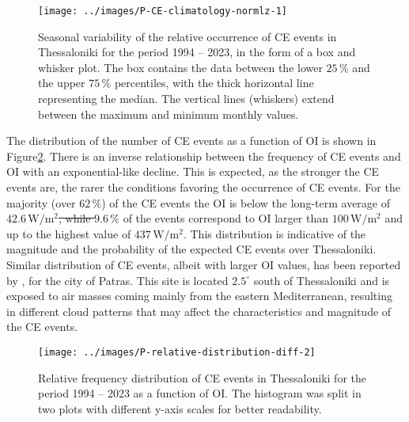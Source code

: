 \documentclass[preprint, 5p,
authoryear]{elsarticle} %
\providecommand{\DIFaddtex}[1]{{\protect\color{blue}\uwave{#1}}} %
\providecommand{\DIFdeltex}[1]{{\protect\color{red}\sout{#1}}}                      %
\providecommand{\DIFaddbegin}{} %
\providecommand{\DIFaddend}{} %
\providecommand{\DIFdelbegin}{} %
\providecommand{\DIFdelend}{} %
\providecommand{\DIFadd}[1]{\texorpdfstring{\DIFaddtex{#1}}{#1}} %
\providecommand{\DIFdel}[1]{\texorpdfstring{\DIFdeltex{#1}}{}} %
\newcommand{\DIFscaledelfig}{0.5}
\newlength{\DIFdelgraphicswidth} %
\newlength{\DIFdelgraphicsheight} %
\newcommand{\DIFaddincludegraphics}[2][]{{\color{blue}\fbox{\DIFOincludegraphics[#1]{#2}}}} %
\newcommand{\DIFdelincludegraphics}[2][]{%
\sbox{\DIFdelgraphicsbox}{\DIFOincludegraphics[#1]{#2}}%
\settoboxwidth{\DIFdelgraphicswidth}{\DIFdelgraphicsbox} %
\settoboxtotalheight{\DIFdelgraphicsheight}{\DIFdelgraphicsbox} %
\scalebox{\DIFscaledelfig}{%
\parbox[b]{\DIFdelgraphicswidth}{\usebox{\DIFdelgraphicsbox}\\[-\baselineskip] \rule{\DIFdelgraphicswidth}{0em}}\llap{\resizebox{\DIFdelgraphicswidth}{\DIFdelgraphicsheight}{%
\setlength{\unitlength}{\DIFdelgraphicswidth}%
\begin{picture}(1,1)%
\thicklines\linethickness{2pt} %
{\color[rgb]{1,0,0}\put(0,0){\framebox(1,1){}}}%
{\color[rgb]{1,0,0}\put(0,0){\line( 1,1){1}}}%
{\color[rgb]{1,0,0}\put(0,1){\line(1,-1){1}}}%
\end{picture}%
}\hspace*{3pt}}} %
} %
\DeclareRobustCommand{\DIFaddbegin}{\DIFOaddbegin \let\includegraphics\DIFaddincludegraphics} %
\DeclareRobustCommand{\DIFaddend}{\DIFOaddend \let\includegraphics\DIFOincludegraphics} %
\DeclareRobustCommand{\DIFdelbegin}{\DIFOdelbegin \let\includegraphics\DIFdelincludegraphics} %
\DeclareRobustCommand{\DIFdelend}{\DIFOaddend \let\includegraphics\DIFOincludegraphics} %
\begin{document}
\begin{figure}

{\centering \texttt{[image: ../images/P-CE-climatology-normlz-1]} 

}

\caption{Seasonal variability of the relative occurrence of CE events in Thessaloniki for the period 1994 -- 2023, in the form of a box and whisker plot. The box contains the data between the lower $25\,\%$ and the upper $75\,\%$ percentiles, with the thick horizontal line representing the median. The vertical lines (whiskers) extend between the maximum and minimum monthly values.}\label{fig:relative-month-occurrences}
\end{figure}

The distribution of the number of CE events as a function of OI is shown
in Figure\nobreakspace{}\ref{fig:ovir-distribution}. There is an inverse
relationship between the frequency of CE events and OI with an
exponential-like decline. This is expected, as the stronger the CE
events are, the rarer the conditions favoring the occurrence of CE
events. For the majority (over \(62\,\%\)) of the CE events the OI is
below the long-term average of \DIFdelbegin \DIFdel{\(42.6\,\text{W}/\text{m}^2\), while
\(9.6\,\%\) }\DIFdelend \DIFaddbegin \DIFadd{\(42.7\,\text{W}/\text{m}^2\), while
\(9.7\,\%\) }\DIFaddend of the events correspond to OI larger than
\(100\,\text{W}/\text{m}^2\) and up to the highest value of
\DIFdelbegin \DIFdel{\(437\,\text{W}/\text{m}^2\)}\DIFdelend \DIFaddbegin \DIFadd{\(438.2\,\text{W}/\text{m}^2\)}\DIFaddend . This distribution is indicative of the
magnitude and the probability of the expected CE events over
Thessaloniki. Similar distribution of CE events, albeit with larger OI
values, has been reported by \citet{Vamvakas2020}, for the city of
Patras. This site is located \(2.5^\circ\) south of Thessaloniki and is
exposed to air masses coming mainly from the eastern Mediterranean,
resulting in different cloud patterns that may affect the
characteristics and magnitude of the CE events.

\begin{figure}

{\centering \texttt{[image: ../images/P-relative-distribution-diff-2]} 

}

\caption{Relative frequency distribution of CE events in Thessaloniki for the period 1994 -- 2023 as a function of OI. The histogram was split in two plots with different y-axis scales for better readability.}\label{fig:ovir-distribution}
\end{figure}
\end{document}
